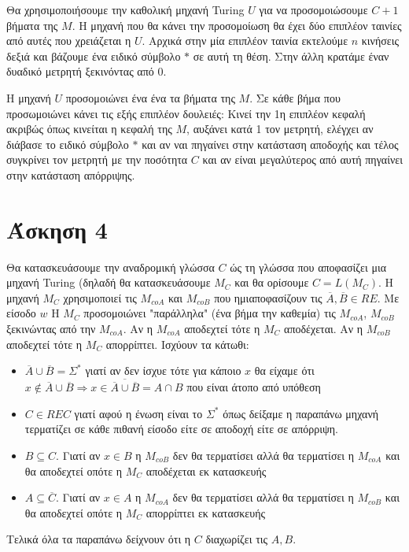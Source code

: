 \documentclass[11pt]{article}
\begin{document}
Θα χρησιμοποιήσουμε την καθολική μηχανή Turing $U$ για να προσομοιώσουμε $C+1$ βήματα της $M$. 
Η μηχανή που θα κάνει την προσομοίωση θα έχει δύο επιπλέον ταινίες από αυτές που χρειάζεται 
η $U$. Αρχικά στην μία επιπλέον ταινία εκτελούμε $n$ κινήσεις δεξιά και βάζουμε ένα ειδικό 
σύμβολο $*$ σε αυτή τη θέση. Στην άλλη κρατάμε έναν δυαδικό μετρητή ξεκινόντας από $0$. 

Η μηχανή $U$ προσομοιώνει ένα ένα τα βήματα της $Μ$. Σε κάθε βήμα που προσωμοιώνει κάνει τις εξής
επιπλέον δουλειές: Κινεί την 1η επιπλέον κεφαλή ακριβώς όπως κινείται η κεφαλή της $M$, αυξάνει 
κατά 1 τον μετρητή, ελέγχει αν διάβασε το ειδικό σύμβολο $*$ και αν ναι πηγαίνει στην κατάσταση αποδοχής 
και τέλος συγκρίνει τον μετρητή με την ποσότητα $C$ και αν είναι μεγαλύτερος από αυτή πηγαίνει 
στην κατάσταση απόρριψης.
                                                              




\section*{Άσκηση 4}
Θα κατασκευάσουμε την αναδρομική γλώσσα $C$ ώς τη γλώσσα που αποφασίζει μια μηχανή Turing 
(δηλαδή θα κατασκευάσουμε $M_C$ και θα ορίσουμε $C=L(M_C)$. Η μηχανή $M_C$
χρησιμοποιεί τις $M_{coA}$ και $M_{coB}$ που ημιαποφασίζουν τις $\overline{A},\overline{B}\in RE$.
Με είσοδο $w$ H $M_C$ προσομοιώνει "παράλληλα" (ένα βήμα την καθεμία) τις $M_{coA}$, $M_{coB}$
ξεκινώντας από την $M_{coA}$. Αν η $M_{coA}$ αποδεχτεί τότε η $M_C$ αποδέχεται. Αν η $M_{coB}$ αποδεχτεί
τότε η $M_C$ απορρίπτει. Ισχύουν τα κάτωθι:
\begin{itemize}
  \item  $\overline{A}\cup \overline{B} = \Sigma^*$ γιατί αν δεν ίσχυε τότε για κάποιο $x$ θα είχαμε ότι
    $x\notin\overline{A}\cup \overline{B} \Rightarrow x\in\overline{\overline{A}\cup \overline{B}}=A\cap B$
    που είναι άτοπο από υπόθεση
  \item $C\in REC$ γιατί αφού η ένωση είναι το $\Sigma^*$ όπως δείξαμε η παραπάνω μηχανή τερματίζει σε 
    κάθε πιθανή είσοδο είτε σε αποδοχή είτε σε απόρριψη.
  \item $B\subseteq C$. Γιατί αν $x\in B$ η $M_{coB}$ δεν θα τερματίσει αλλά θα τερματίσει η  
    $M_{coA}$ και θα αποδεχτεί οπότε η $M_C$ αποδέχεται εκ κατασκευής
  \item $A\subseteq \overline{C}$. Γιατί αν $x\in A$ η $M_{coA}$ δεν θα τερματίσει αλλά θα τερματίσει η  
    $M_{coB}$ και θα αποδεχτεί οπότε η $M_C$ απορρίπτει εκ κατασκευής
\end{itemize}
Τελικά όλα τα παραπάνω δείχνουν ότι η $C$ διαχωρίζει τις $A,B$.
\end{document}
